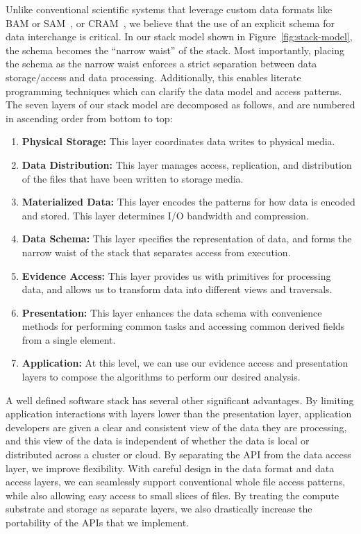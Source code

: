 \documentclass[masters]{ucbthesis}
\begin{document}
Unlike conventional scientific systems that leverage custom data formats like BAM or SAM~\cite{li09},
or CRAM~\cite{fritz11}, we believe that the use of an explicit schema for data interchange is critical.
In our stack model shown in Figure~\ref{fig:stack-model}, the schema becomes the ``narrow waist''
of the stack. Most importantly, placing the schema as the narrow waist enforces a strict separation
between data storage/access and data processing. Additionally, this enables literate programming
techniques which can clarify the data model and access patterns. The seven layers of our stack model
are decomposed as follows, and are numbered in ascending order from bottom to top:

\begin{enumerate}
\item \textbf{Physical Storage:} This layer coordinates data writes to physical media.
\item \textbf{Data Distribution:} This layer manages access, replication, and distribution of the files that have
been written to storage media.
\item \textbf{Materialized Data:} This layer encodes the patterns for how data is encoded and stored. This
layer determines I/O bandwidth and compression.
\item \textbf{Data Schema:} This layer specifies the representation of data, and forms the narrow waist of
the stack that separates access from execution.
\item \textbf{Evidence Access:} This layer provides us with primitives for processing data, and allows us to
transform data into different views and traversals.
\item \textbf{Presentation:} This layer enhances the data schema with convenience methods for performing
common tasks and accessing common derived fields from a single element.
\item \textbf{Application:} At this level, we can use our evidence access and presentation layers to compose
the algorithms to perform our desired analysis.
\end{enumerate}

A well defined software stack has several other significant advantages. By limiting application
interactions with layers lower than the presentation layer, application developers are given a clear and
consistent view of the data they are processing, and this view of the data is independent of whether the
data is local or distributed across a cluster or cloud. By separating the API from the data access layer,
we improve flexibility. With careful design in the data format and data access layers, we can seamlessly
support conventional whole file access patterns, while also allowing easy access to small slices of files.
By treating the compute substrate and storage as separate layers, we also drastically increase
the portability of the APIs that we implement.
\end{document}
